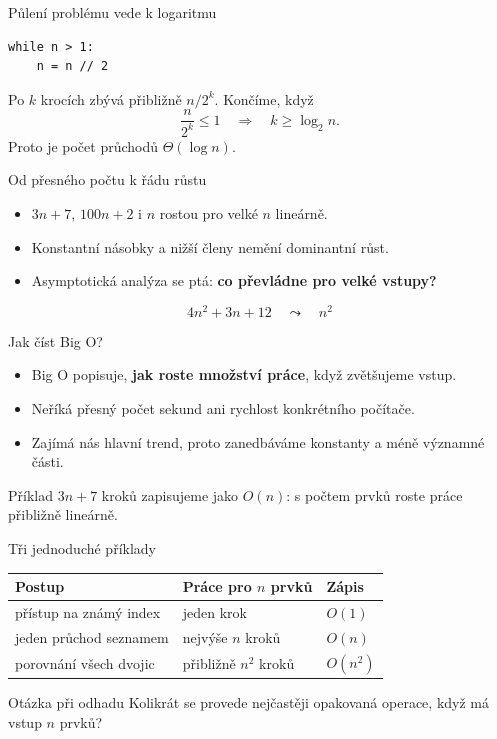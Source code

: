 \documentclass[aspectratio=169]{beamer}
\begin{document}
\begin{frame}[fragile]{Půlení problému vede k logaritmu}
\begin{lstlisting}[style=python]
while n > 1:
    n = n // 2
\end{lstlisting}
  Po \(k\) krocích zbývá přibližně \(n/2^k\). Končíme, když
  \[
    \frac{n}{2^k}\leq 1 \quad\Rightarrow\quad k\geq \log_2 n.
  \]
  Proto je počet průchodů \(\Theta(\log n)\).
\end{frame}

\begin{frame}{Od přesného počtu k řádu růstu}
  \begin{itemize}
    \item \(3n+7\), \(100n+2\) i \(n\) rostou pro velké \(n\) lineárně.
    \item Konstantní násobky a nižší členy nemění dominantní růst.
    \item Asymptotická analýza se ptá: \textbf{co převládne pro velké vstupy?}
  \end{itemize}
  \[
    4n^2+3n+12 \quad\leadsto\quad n^2
  \]
\end{frame}

\begin{frame}{Jak číst Big O?}
  \begin{itemize}
    \item Big O popisuje, \textbf{jak roste množství práce}, když zvětšujeme vstup.
    \item Neříká přesný počet sekund ani rychlost konkrétního počítače.
    \item Zajímá nás hlavní trend, proto zanedbáváme konstanty a méně významné části.
  \end{itemize}
  \begin{block}{Příklad}
    \(3n+7\) kroků zapisujeme jako \(O(n)\): s počtem prvků roste práce přibližně lineárně.
  \end{block}
\end{frame}

\begin{frame}{Tři jednoduché příklady}
  \centering
  \begin{tabular}{lll}
    \textbf{Postup} & \textbf{Práce pro \(n\) prvků} & \textbf{Zápis} \\
    \hline
    přístup na známý index & jeden krok & \(O(1)\) \\
    jeden průchod seznamem & nejvýše \(n\) kroků & \(O(n)\) \\
    porovnání všech dvojic & přibližně \(n^2\) kroků & \(O(n^2)\) \\
  \end{tabular}
  \vspace{8mm}
  \begin{block}{Otázka při odhadu}
    Kolikrát se provede nejčastěji opakovaná operace, když má vstup \(n\) prvků?
  \end{block}
\end{frame}
\end{document}
